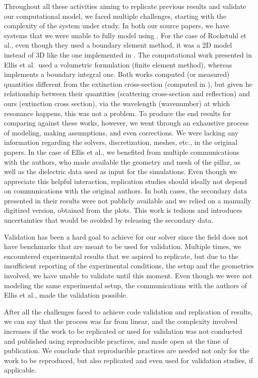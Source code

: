 
Throughout all these activities aiming to replicate previous results and validate our computational model, we faced multiple challenges, starting with the complexity of the system under study. In both our source papers, we have systems that we were unable to fully 
model using \pygbe. For the case of Rockstuhl et al., even though they used a boundary element method, it was a 2D model instead of 3D like the one implemented in \pygbe. The computational work presented in Ellis et al.\ used a volumetric 
formulation (finite element method), whereas \pygbe implements a boundary integral one. Both works computed (or measured) quantities different from the extinction cross-section (computed in \pygbe), but given he relationship between their quantities (scattering cross-section and reflection)  
and ours (extinction cross section), via the wavelength (wavenumber) at which resonance happens, this was not a problem. To produce the end results for comparing against these works, however, we went through an 
exhaustive process of modeling, making assumptions, and even corrections. We were lacking any information regarding the solvers, discretization, meshes, etc., in the original papers. In the case of Ellis et al., we benefited from multiple communications with the authors, 
who made available the geometry and mesh of the pillar, as well as the dielectric data used as input for the simulations. Even though we appreciate this helpful interaction, replication studies should ideally not depend on communications with the original authors. 
In both cases, the secondary data presented in their results were not publicly available and we relied on a manually digitized version, obtained from the plots. This work is tedious and introduces uncertainties that would be avoided by releasing 
the secondary data.

Validation has been a hard goal to achieve for our solver since the field does not have benchmarks that are meant to be used for validation. Multiple times,
we encountered experimental results that we aspired to replicate, but due to the insufficient reporting of the experimental conditions, the setup and the geometries involved, 
we have unable to validate until this moment. Even though we were not modeling the same experimental setup, the communications with the authors of Ellis et al., made 
the validation possible.

After all the challenges faced to achieve code validation and replication of results, we can say that the process was far from  linear, 
and the complexity involved increases if the work to be replicated or used for validation was not conducted and published using reproducible practices, and made open at the time 
of publication. We conclude that reproducible practices are needed not only for the work to be reproduced, but also 
replicated and even used for validation studies, if applicable.
